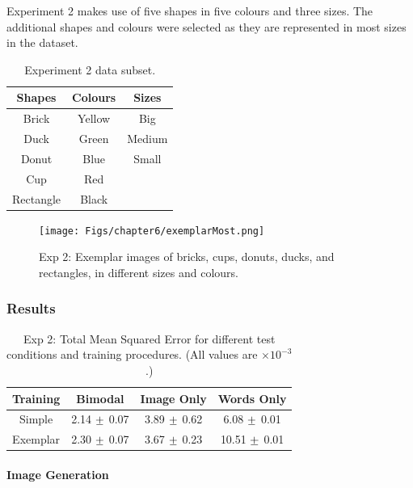 Experiment 2 makes use of five shapes in five colours and three sizes. The additional shapes and colours were selected as they are represented in most sizes in the dataset.

\begin{table}[h]
\centering
\begin{tabular}{|c|c|c|}
\hline

\textbf{Shapes}  & \textbf{Colours} & \textbf{Sizes}\\ \hline \hline
Brick  & Yellow  & Big \\ \hline
Duck   & Green   & Medium \\ \hline
Donut & Blue & Small \\ \hline
Cup  & Red & \\ \hline
Rectangle & Black & \\ \hline

\end{tabular}
\caption{Experiment 2 data subset.}
\label{tab:6_exp2_data} 
\end{table}

\begin{figure}[ht]
    \centering
    \texttt{[image: Figs/chapter6/exemplarMost.png]}
    \caption{Exp 2: Exemplar images of bricks, cups, donuts, ducks, and rectangles, in different sizes and colours.}
    \label{fig:ExmMost}
\end{figure}


\subsubsection{Results}

\begin{table}[h!]
\centering
	\begin{tabular}{|c|c|c|c|}
	\hline
\textbf{Training} & 	\textbf{Bimodal} & 	\textbf{Image Only} 	& 	\textbf{Words Only} \\ \hline
Simple &  2.14 $\mypm$	0.07 & 3.89 $\mypm$	0.62 & 6.08 $\mypm$ 0.01 \\ \hline
Exemplar & 2.30 $\mypm$ 0.07 & 3.67 $\mypm$ 0.23
& 10.51	$\mypm$ 0.01 \\ \hline

\end{tabular}
\caption{Exp 2: Total Mean Squared Error for different test conditions and training procedures. (All values are $\times10^{-3}$.)}
\label{tab:6_res_exp2}
\end{table}


\paragraph{Image Generation}

